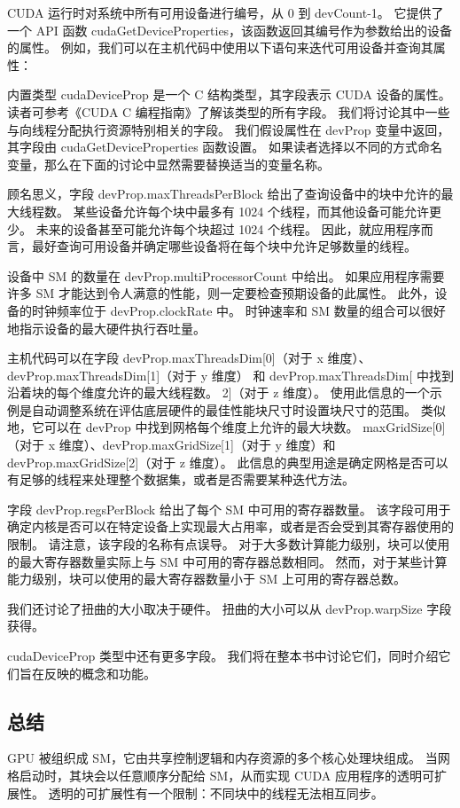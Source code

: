 CUDA 运行时对系统中所有可用设备进行编号，从 0 到 devCount-1。 
它提供了一个 API 函数 cudaGetDeviceProperties，该函数返回其编号作为参数给出的设备的属性。 
例如，我们可以在主机代码中使用以下语句来迭代可用设备并查询其属性：

内置类型 cudaDeviceProp 是一个 C 结构类型，其字段表示 CUDA 设备的属性。 
读者可参考《CUDA C 编程指南》了解该类型的所有字段。 我们将讨论其中一些与向线程分配执行资源特别相关的字段。 
我们假设属性在 devProp 变量中返回，其字段由 cudaGetDeviceProperties 函数设置。 
如果读者选择以不同的方式命名变量，那么在下面的讨论中显然需要替换适当的变量名称。

顾名思义，字段 devProp.maxThreadsPerBlock 给出了查询设备中的块中允许的最大线程数。 
某些设备允许每个块中最多有 1024 个线程，而其他设备可能允许更少。 未来的设备甚至可能允许每个块超过 1024 个线程。 
因此，就应用程序而言，最好查询可用设备并确定哪些设备将在每个块中允许足够数量的线程。

设备中 SM 的数量在 devProp.multiProcessorCount 中给出。 
如果应用程序需要许多 SM 才能达到令人满意的性能，则一定要检查预期设备的此属性。 
此外，设备的时钟频率位于 devProp.clockRate 中。 时钟速率和 SM 数量的组合可以很好地指示设备的最大硬件执行吞吐量。

主机代码可以在字段 devProp.maxThreadsDim[0]（对于 x 维度）、
devProp.maxThreadsDim[1]（对于 y 维度）
和 devProp.maxThreadsDim[ 中找到沿着块的每个维度允许的最大线程数。 2]（对于 z 维度）。 
使用此信息的一个示例是自动调整系统在评估底层硬件的最佳性能块尺寸时设置块尺寸的范围。 
类似地，它可以在 devProp 中找到网格每个维度上允许的最大块数。 
maxGridSize[0]（对于 x 维度）、devProp.maxGridSize[1]（对于 y 维度）和 devProp.maxGridSize[2]（对于 z 维度）。 
此信息的典型用途是确定网格是否可以有足够的线程来处理整个数据集，或者是否需要某种迭代方法。

字段 devProp.regsPerBlock 给出了每个 SM 中可用的寄存器数量。 
该字段可用于确定内核是否可以在特定设备上实现最大占用率，或者是否会受到其寄存器使用的限制。 
请注意，该字段的名称有点误导。 对于大多数计算能力级别，块可以使用的最大寄存器数量实际上与 SM 中可用的寄存器总数相同。 
然而，对于某些计算能力级别，块可以使用的最大寄存器数量小于 SM 上可用的寄存器总数。

我们还讨论了扭曲的大小取决于硬件。 扭曲的大小可以从 devProp.warpSize 字段获得。

cudaDeviceProp 类型中还有更多字段。 我们将在整本书中讨论它们，同时介绍它们旨在反映的概念和功能。

\subsection{总结}
GPU 被组织成 SM，它由共享控制逻辑和内存资源的多个核心处理块组成。 
当网格启动时，其块会以任意顺序分配给 SM，从而实现 CUDA 应用程序的透明可扩展性。 
透明的可扩展性有一个限制：不同块中的线程无法相互同步。

